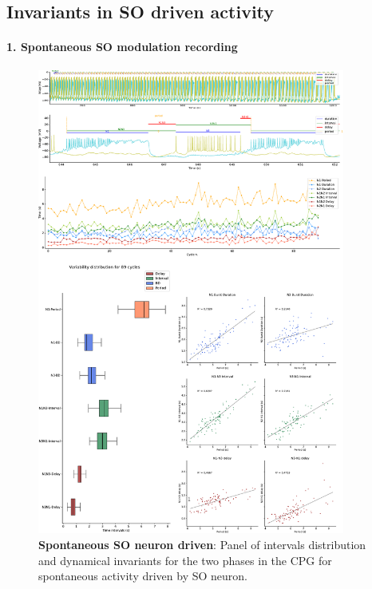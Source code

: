 \subsection{Invariants in SO driven activity}
\paragraph{1. Spontaneous SO modulation recording}
 
\begin{figure}[htbp]
	\centering
	\includegraphics[width=0.9\textwidth]{./invariants/data/SUSSEX/prep4_so_driven_2/images/panel_with_intervals.pdf}
	\caption{\textbf{Spontaneous SO neuron driven}: Panel of intervals distribution and dynamical invariants for the two phases in the CPG for spontaneous activity driven by SO neuron.}
	\label{fig:so spontaneous invariants}
\end{figure}

